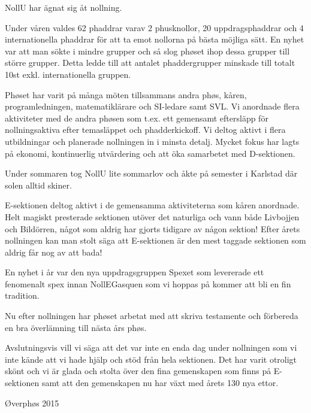 \documentclass[../_main/handlingar.tex]{subfiles}
\begin{document}

NollU har ägnat sig åt nollning.

Under våren valdes 62 phaddrar varav 2 phusknollor, 20 uppdragsphaddrar och 4 internationella phaddrar för att ta emot nollorna på bästa möjliga sätt. En nyhet var att man sökte i mindre grupper och så slog phøset ihop dessa grupper till större grupper. Detta ledde till att antalet phaddergrupper minskade till totalt 10st exkl. internationella gruppen.

Phøset har varit på många möten tillsammans andra phøs, kåren, programledningen, matematiklärare och SI-ledare samt SVL. Vi anordnade flera aktiviteter med de andra phøsen som t.ex. ett gemensamt eftersläpp för nollningsaktiva efter temasläppet och phadderkickoff. Vi deltog aktivt i flera utbildningar och planerade nollningen in i minsta detalj. Mycket fokus har lagts på ekonomi, kontinuerlig utvärdering och att öka samarbetet med D-sektionen.

Under sommaren tog NollU lite sommarlov och åkte på semester i Karlstad där solen alltid skiner.

E-sektionen deltog aktivt i de gemensamma aktiviteterna som kåren anordnade. Helt magiskt presterade sektionen utöver det naturliga och vann både Livbojjen och Bildörren, något som aldrig har gjorts tidigare av någon sektion! Efter årets nollningen kan man stolt säga att E-sektionen är den mest taggade sektionen som aldrig får nog av att bada!

En nyhet i år var den nya uppdragsgruppen Spexet som levererade ett fenomenalt spex innan NollEGasquen som vi hoppas på kommer att bli en fin tradition.

Nu efter nollningen har phøset arbetat med att skriva testamente och förbereda en bra överlämning till nästa års phøs.

Avslutningsvis vill vi säga att det var inte en enda dag under nollningen som vi inte kände att vi hade hjälp och stöd från hela sektionen. Det har varit otroligt skönt och vi är glada och stolta över den fina gemenskapen som finns på E-sektionen samt att den gemenskapen nu har växt med årets 130 nya ettor.

\begin{signatures}{1}
    \mvh
    \signature{Henrik Fryklund}{Øverphøs 2015}
\end{signatures}
\end{document}
